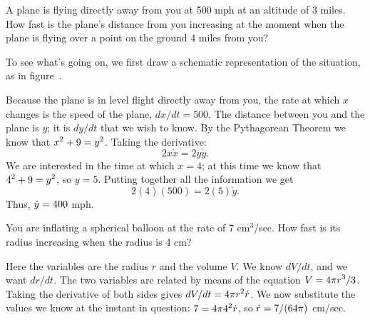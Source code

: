\begin{example}
\label{exam:receding airplane}
A plane is flying directly away from you at 500 mph at an altitude of
3 miles.  How fast is the plane's distance from you increasing at the
moment when the plane is flying over a point on the ground 4 miles
from you?

To see what's going on, we first draw a schematic representation of
the situation, as in figure~.


Because the plane is in level flight directly away from you, the rate
at which $x$ changes is the speed of the plane, $dx/dt=500$. The
distance between you and the plane is $y$; it is $dy/dt$ that we wish
to know. By the Pythagorean Theorem we know that $\displaystyle x^2+9=y^2$. Taking
the derivative:
$$ 2x \dot x = 2y\dot y.$$
We are interested in the time at which $x=4$; at this time we know
that $\displaystyle 4^2+9=y^2$, so $y=5$. Putting together all the information we
get
$$2(4)(500)=2(5)\dot y.$$
Thus, $\displaystyle \dot y=400$ mph.
\end{example}

\begin{example}
You are inflating a spherical balloon at the rate of 7 cm${}^3$/sec.  How
fast is its radius increasing when the radius is 4 cm?

Here the variables are the radius $r$ and the volume $V$.  We know $dV/dt$,
and we want $dr/dt$.  The two variables are related by means of the
equation $\displaystyle V=4\pi r^3/3$.  Taking the derivative of both sides gives
$\displaystyle dV/dt=4\pi r^2\dot r$.  We now substitute the values we know at the
instant in question: $\displaystyle 7=4\pi 4^2\dot r$, so
$\displaystyle \dot r=7/(64\pi)$ cm/sec.
\end{example}

